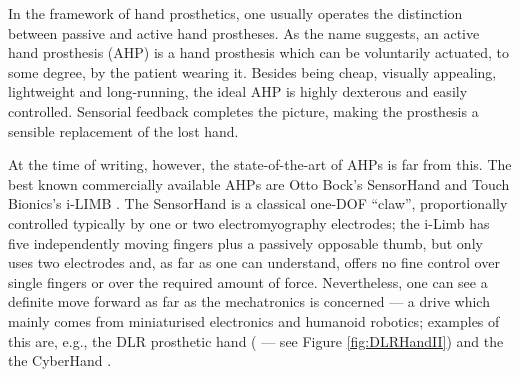 In the framework of hand prosthetics, one usually operates the
distinction between passive and active hand prostheses. As the name
suggests, an active hand prosthesis (AHP) is a hand prosthesis which
can be voluntarily actuated, to some degree, by the patient wearing
it. Besides being cheap, visually appealing, lightweight and
long-running, the ideal AHP is highly dexterous and easily
controlled. Sensorial feedback completes the picture, making the
prosthesis a sensible replacement of the lost hand.

At the time of writing, however, the state-of-the-art of AHPs is far
from this. The best known commercially available AHPs are Otto Bock's
SensorHand \cite{sensorhand} and Touch Bionics's i-LIMB
\cite{ilimb}. The SensorHand is a classical one-DOF ``claw'',
proportionally controlled typically by one or two electromyography
electrodes; the i-Limb has five independently moving fingers plus a
passively opposable thumb, but only uses two electrodes and, as far as
one can understand, offers no fine control over single fingers or over
the required amount of force. Nevertheless, one can see a definite
move forward as far as the mechatronics is concerned --- a drive which
mainly comes from miniaturised electronics and humanoid robotics;
examples of this are, e.g., the DLR prosthetic hand (\cite{Hua2006}
--- see Figure \ref{fig:DLRHandII}) and the the CyberHand
\cite{cyberhand}.

